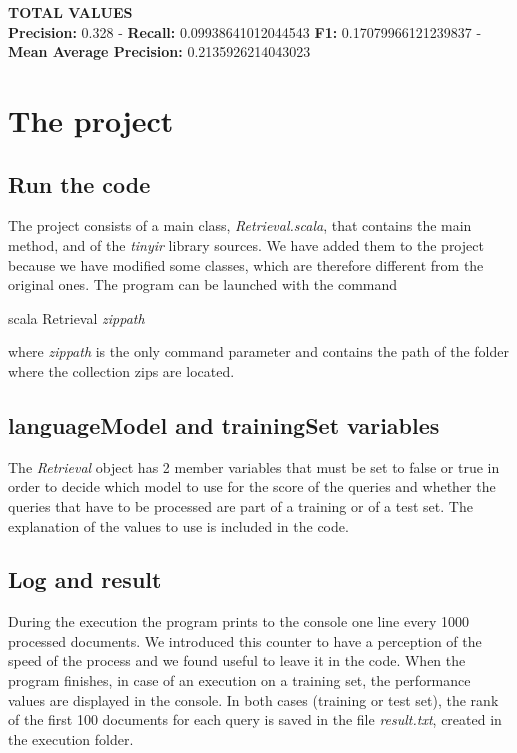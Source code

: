 \documentclass[a4paper, 11pt]{article}
\begin{document}
\textbf{TOTAL VALUES}\\

\textbf{Precision:} 0.328 - \textbf{Recall:} 0.09938641012044543 \textbf{F1:} 0.17079966121239837 - \textbf{Mean Average Precision:} 0.2135926214043023


\section{The project}

\subsection{Run the code}
The project consists of a main class, \textit{Retrieval.scala}, that contains the main method, and of the \textit{tinyir} library sources. We have added them to the project because we have modified some classes, which are therefore different from the original ones.
The program can be launched with the command

\begin{center}
scala Retrieval \textit{zippath}
\end{center}

where \textit{zippath} is the only command parameter and contains the path of the folder where the collection zips are located.

\subsection{languageModel and trainingSet variables}
The \textit{Retrieval} object has 2 member variables that must be set to false or true in order to decide which model to use for the score of the queries and whether the queries 
that have to be processed are part of a training or of a test set. The explanation of the values to use is included in the code.

\subsection{Log and result}
During the execution the program prints to the console one line every 1000 processed documents. We introduced this counter to have a perception of the speed of the process and we found useful to leave it in the code. When the program finishes, in case of an execution on a training set, the performance values are displayed in the console. In both cases (training or test set), the rank of the first 100 documents for each query is saved in the file \textit{result.txt}, created in the execution folder.
\end{document}
